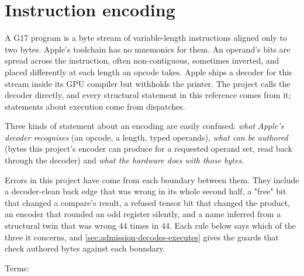 \chapter{Instruction encoding}\label{ch:instruction-encoding}

A G17 program is a byte stream of variable-length instructions aligned only to two bytes. Apple's toolchain has no
mnemonics for them. An operand's bits are spread across the instruction, often non-contiguous, sometimes inverted, and
placed differently at each length an opcode takes. Apple ships a decoder for this stream inside its GPU compiler but
withholds the printer. The project calls the decoder directly, and every structural statement in this reference comes
from it; statements about execution come from dispatches.

Three kinds of statement about an encoding are easily confused: \emph{what Apple's decoder recognises} (an opcode, a
length, typed operands), \emph{what can be authored} (bytes this project's encoder can produce for a requested operand
set, read back through the decoder) and \emph{what the hardware does with those bytes}.

Errors in this project have come from each boundary between them. They include a decoder-clean back edge that was wrong in its
whole second half, a "free" bit that changed a compare's result, a refused tensor bit that changed the product, an
encoder that rounded an odd register silently, and a name inferred from a structural twin that was wrong 44 times in 44.
Each rule below says which of the three it concerns, and \cref{sec:admission-decodes-executes} gives the guards that
check authored bytes against each boundary.

Terms:

